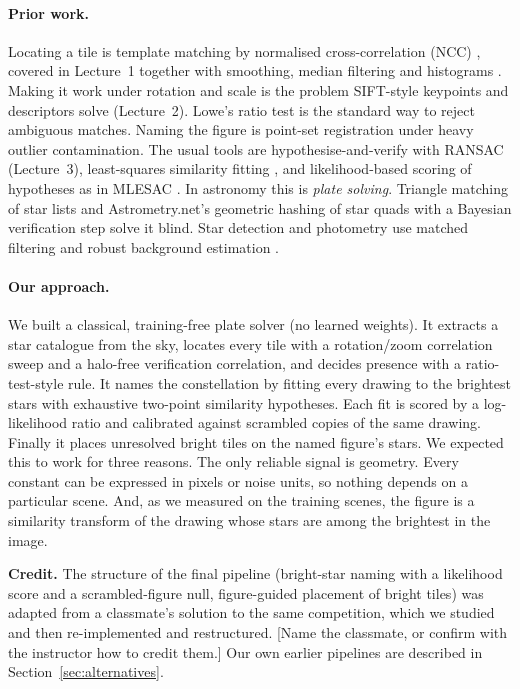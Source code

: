 \documentclass[a4paper,11pt]{article}
\newcommand{\fillin}[1]{{\color{red}[#1]}}
\begin{document}
\paragraph{Prior work.} Locating a tile is template matching by normalised cross-correlation (NCC) \parencite{lewis1995fast},
covered in Lecture~1 together with smoothing, median filtering and histograms \parencite{cv2026lectures}. Making it
work under rotation and scale is the problem SIFT-style keypoints and descriptors solve \parencite{lowe2004distinctive}
(Lecture~2). Lowe's ratio test is the standard way to reject ambiguous matches. Naming the figure is point-set
registration under heavy outlier contamination. The usual tools are hypothesise-and-verify with RANSAC
\parencite{fischler1981ransac} (Lecture~3), least-squares similarity fitting \parencite{umeyama1991least}, and
likelihood-based scoring of hypotheses as in MLESAC \parencite{torr2000mlesac}. In astronomy this is \emph{plate
solving}. Triangle matching of star lists \parencite{groth1986pattern} and Astrometry.net's geometric hashing of star
quads with a Bayesian verification step \parencite{lang2010astrometry} solve it blind. Star detection and photometry
use matched filtering and robust background estimation \parencite{stetson1987daophot, bertin1996sextractor}.

\paragraph{Our approach.} We built a classical, training-free plate solver (no learned weights). It extracts a star catalogue from the
sky, locates every tile with a rotation/zoom correlation sweep and a halo-free verification correlation, and decides
presence with a ratio-test-style rule. It names the constellation by fitting every drawing to the brightest stars with
exhaustive two-point similarity hypotheses. Each fit is scored by a log-likelihood ratio and calibrated against
scrambled copies of the same drawing. Finally it places unresolved bright tiles on the named figure's stars. We
expected this to work for three reasons. The only reliable signal is geometry. Every constant can be expressed in
pixels or noise units, so nothing depends on a particular scene. And, as we measured on the training scenes, the
figure is a similarity transform of the drawing whose stars are among the brightest in the image.

\textbf{Credit.} The structure of the final pipeline (bright-star naming with a likelihood score and a scrambled-figure
null, figure-guided placement of bright tiles) was adapted from a classmate's solution to the same competition, which
we studied and then re-implemented and restructured. \fillin{Name the classmate, or confirm with the instructor how to
credit them.} Our own earlier pipelines are described in Section~\ref{sec:alternatives}.
\end{document}
